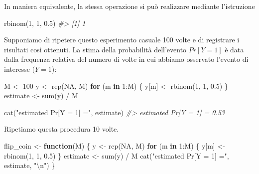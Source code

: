 \documentclass[
  11pt,
]{krantz}
\makeatletter
\newenvironment{Shaded}{\begin{snugshade}}{\end{snugshade}}
\newcommand{\CommentTok}[1]{\textcolor[rgb]{0.37,0.37,0.37}{\textit{#1}}}
\newcommand{\ConstantTok}[1]{\textcolor[rgb]{0,0,0}{#1}}
\newcommand{\ControlFlowTok}[1]{\textcolor[rgb]{0.27,0.27,0.27}{\textbf{#1}}}
\newcommand{\DecValTok}[1]{\textcolor[rgb]{0.06,0.06,0.06}{#1}}
\newcommand{\FloatTok}[1]{\textcolor[rgb]{0.06,0.06,0.06}{#1}}
\newcommand{\FunctionTok}[1]{\textcolor[rgb]{0,0,0}{#1}}
\newcommand{\NormalTok}[1]{#1}
\newcommand{\OtherTok}[1]{\textcolor[rgb]{0.37,0.37,0.37}{#1}}
\newcommand{\SpecialCharTok}[1]{\textcolor[rgb]{0,0,0}{#1}}
\newcommand{\StringTok}[1]{\textcolor[rgb]{0.5,0.5,0.5}{#1}}
\newenvironment{kframe}{%
\medskip{}
\setlength{\fboxsep}{.8em}
 \def\at@end@of@kframe{}%
 \ifinner\ifhmode%
  \def\at@end@of@kframe{\end{minipage}}%
  \begin{minipage}{\columnwidth}%
 \fi\fi%
 \def\FrameCommand##1{\hskip\@totalleftmargin \hskip-\fboxsep
 \colorbox{shadecolor}{##1}\hskip-\fboxsep
     \hskip-\linewidth \hskip-\@totalleftmargin \hskip\columnwidth}%
 \MakeFramed {\advance\hsize-\width
   \@totalleftmargin\z@ \linewidth\hsize
   \@setminipage}}%
 {\par\unskip\endMakeFramed%
 \at@end@of@kframe}
\renewenvironment{Shaded}{\begin{kframe}}{\end{kframe}}
\theoremstyle{definition}
\theoremstyle{definition}
\theoremstyle{definition}
\theoremstyle{definition}
\theoremstyle{remark}
\makeatother
\begin{document}
\noindent In maniera equivalente, la stessa operazione si può realizzare mediante l'istruzione

\begin{Shaded}
\begin{Highlighting}[]
\FunctionTok{rbinom}\NormalTok{(}\DecValTok{1}\NormalTok{, }\DecValTok{1}\NormalTok{, }\FloatTok{0.5}\NormalTok{)}
\CommentTok{\#\textgreater{} [1] 1}
\end{Highlighting}
\end{Shaded}

Supponiamo di ripetere questo esperimento casuale 100 volte e di registrare i risultati così ottenuti. La stima della probabilità dell'evento \(Pr[Y = 1]\) è data dalla frequenza relativa del numero di volte in cui abbiamo osservato l'evento di interesse (\(Y = 1\)):

\begin{Shaded}
\begin{Highlighting}[]
\NormalTok{M }\OtherTok{\textless{}{-}} \DecValTok{100}
\NormalTok{y }\OtherTok{\textless{}{-}} \FunctionTok{rep}\NormalTok{(}\ConstantTok{NA}\NormalTok{, M)}
\ControlFlowTok{for}\NormalTok{ (m }\ControlFlowTok{in} \DecValTok{1}\SpecialCharTok{:}\NormalTok{M) \{}
\NormalTok{  y[m] }\OtherTok{\textless{}{-}} \FunctionTok{rbinom}\NormalTok{(}\DecValTok{1}\NormalTok{, }\DecValTok{1}\NormalTok{, }\FloatTok{0.5}\NormalTok{)}
\NormalTok{\}}
\NormalTok{estimate }\OtherTok{\textless{}{-}} \FunctionTok{sum}\NormalTok{(y) }\SpecialCharTok{/}\NormalTok{ M}

\FunctionTok{cat}\NormalTok{(}\StringTok{"estimated Pr[Y = 1] ="}\NormalTok{, estimate)}
\CommentTok{\#\textgreater{} estimated Pr[Y = 1] = 0.53}
\end{Highlighting}
\end{Shaded}

Ripetiamo questa procedura 10 volte.

\begin{Shaded}
\begin{Highlighting}[]
\NormalTok{flip\_coin }\OtherTok{\textless{}{-}} \ControlFlowTok{function}\NormalTok{(M) \{}
\NormalTok{  y }\OtherTok{\textless{}{-}} \FunctionTok{rep}\NormalTok{(}\ConstantTok{NA}\NormalTok{, M)}
  \ControlFlowTok{for}\NormalTok{ (m }\ControlFlowTok{in} \DecValTok{1}\SpecialCharTok{:}\NormalTok{M) \{}
\NormalTok{    y[m] }\OtherTok{\textless{}{-}} \FunctionTok{rbinom}\NormalTok{(}\DecValTok{1}\NormalTok{, }\DecValTok{1}\NormalTok{, }\FloatTok{0.5}\NormalTok{)}
\NormalTok{  \}}
\NormalTok{  estimate }\OtherTok{\textless{}{-}} \FunctionTok{sum}\NormalTok{(y) }\SpecialCharTok{/}\NormalTok{ M}
  \FunctionTok{cat}\NormalTok{(}\StringTok{"estimated Pr[Y = 1] ="}\NormalTok{, estimate, }\StringTok{"}\SpecialCharTok{\textbackslash{}n}\StringTok{"}\NormalTok{)}
\NormalTok{\}}
\end{Highlighting}
\end{Shaded}
\end{document}
